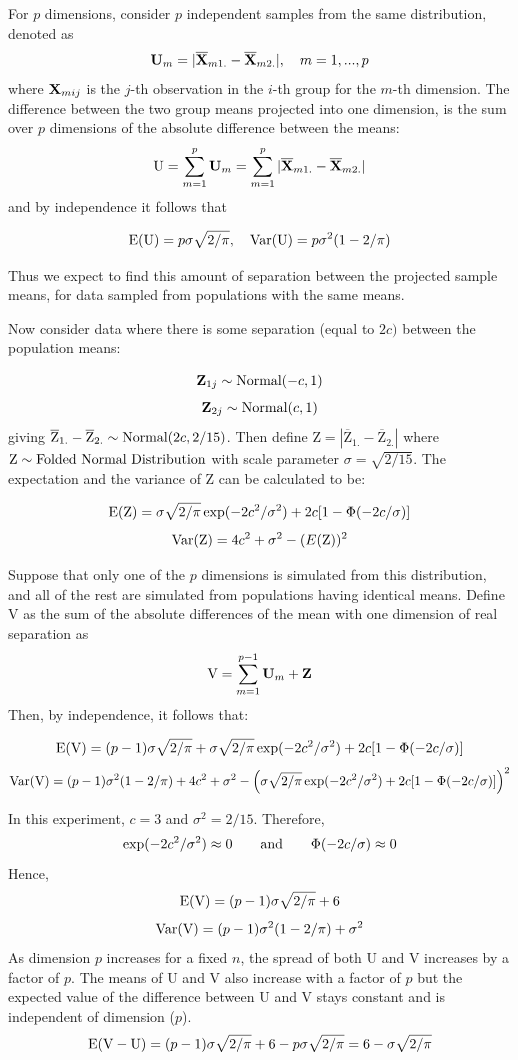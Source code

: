 For $p$ dimensions, consider $p$ independent samples from the same distribution,  denoted as $${\mbox{\boldmath {\bf U}}}_m = |\overline{{\mbox{\boldmath {\bf X}}}}_{m1.} - \overline{{\mbox{\boldmath {\bf X}}}}_{m2.}|, ~~~ m=1, ..., p$$ where ${\mbox{\boldmath {\bf X}}} _{mij}$ is the $j$-th observation in the $i$-th group for the $m$-th dimension. The difference between the two group means projected into one dimension, is the sum over $p$ dimensions of the absolute difference between the means: $$\mbox{U}  = \sum_{m=1}^p {\mbox{\boldmath {\bf U}}}_m = \sum_{m=1}^p |\overline{{\mbox{\boldmath {\bf X}}}}_{m1.} - \overline{{\mbox{\boldmath {\bf X}}}}_{m2.}| $$ and by independence it follows that

$$\hbox{E}(\mbox{U}) = p \sigma \sqrt{2/\pi}, ~~~ 
\hbox{Var}(\mbox{U}) = p \sigma^2 (1 - 2/\pi)$$

\noindent Thus we expect to find this amount of separation between the projected sample means, for data sampled from populations with the same means.

Now consider data where there is some separation (equal to $2c)$ between the population means:

$${\mbox{\boldmath {\bf Z}}}_{1j} \sim \hbox{Normal}(-c, 1) $$
$${\mbox{\boldmath {\bf Z}}}_{2j} \sim \hbox{Normal}(c, 1) $$ 
giving $\overline{\mbox{Z}}_{1.} - \overline{\mbox{Z}}_{2.} \sim \hbox{Normal}(2c, 2/15)$. Then define $\mbox{Z}  = |\overline{\mbox{Z}}_{1.} - \overline{\mbox{Z}}_{2.}|$ where ${\mbox{Z}} \sim \hbox{Folded Normal Distribution}$ with scale parameter $ \sigma = \sqrt{2/15}$.  The expectation and the variance of $\mbox{Z}$ can be calculated to be:

$$\hbox{E}(\mbox{Z}) = \sigma \sqrt{2/\pi} \exp(- 2c^2/\sigma^2) + 2c[1 - \Phi(-2c/\sigma)]$$
$$\hbox{Var}(\mbox{Z}) = 4c^2 + \sigma^2 - (E(\mbox{Z}))^2$$

Suppose that only one of the $p$ dimensions is simulated from this distribution, and all of the rest are simulated from populations having identical means. Define $\mbox{V}$ as the sum of the absolute differences of the mean with one dimension of real separation as $$\mbox{V} = \sum_{m=1}^{p-1} \mbox{\boldmath {\bf U}}_m + {\mbox{\boldmath {\bf Z}}}$$ Then, by independence, it follows that:

$$\hbox{E}(\mbox{V}) = (p - 1) \sigma \sqrt{2/\pi} + \sigma \sqrt{2/\pi} \exp(- 2c^2/\sigma^2) + 2c[1 - \Phi(-2c/\sigma)]$$
$$\hbox{Var}(\mbox{V}) = (p - 1)\sigma^2 (1 - 2/\pi) + 4c^2 + \sigma^2 - \left( \sigma \sqrt{2/\pi} \exp(- 2c^2/\sigma^2) + 2c[1 - \Phi(-2c/\sigma)]\right)^2$$

In this experiment, $c = 3$ and $\sigma^2 = 2/15$. Therefore,
$$\exp(- 2c^2/\sigma^2) \approx 0 \qquad \hbox{and} \qquad \Phi(-2c/\sigma) \approx 0$$
Hence,
$$\hbox{E}(\mbox{V}) = (p - 1) \sigma \sqrt{2/\pi} + 6$$
$$\hbox{Var}(\mbox{V}) = (p - 1)\sigma^2 (1 - 2/\pi) + \sigma^2$$
As dimension $p$ increases for a fixed $n$, the spread of both U and V increases by a factor of $p$. The means of U and V also increase with a factor of $p$ but the expected value of the difference between U and V stays constant and is independent of dimension ($p$). 
$$\hbox{E} (\mbox{V} - \mbox{U}) = (p - 1) \sigma \sqrt{2/\pi} + 6 - p \sigma \sqrt{2/\pi} = 6 - \sigma \sqrt{2/\pi}$$

